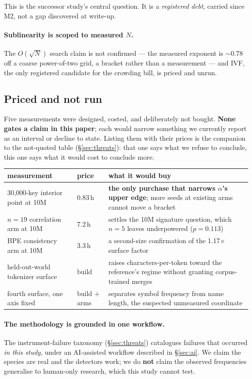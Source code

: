 \noindent This is the successor study's central question. It is a \emph{registered debt}, carried
since M2, not a gap discovered at write-up.

\paragraph{Sublinearity is scoped to measured $N$.} The $O(\sqrt{N})$ search claim is not confirmed
--- the measured exponent is ${\sim}0.78$ off a coarse power-of-two grid, a bracket rather than a
measurement --- and IVF, the only registered candidate for the crowding bill, is priced and unrun.

\subsection*{Priced and not run}

Five measurements were designed, costed, and deliberately not bought. \textbf{None gates a claim in
this paper}; each would narrow something we currently report as an interval or decline to state.
Listing them with their prices is the companion to the not-quoted table (\S\ref{sec:threats}): that
one says what we refuse to conclude, this one says what it would cost to conclude more.

\begin{center}\small
\begin{tabular}{@{}p{5.4cm}lp{5.6cm}@{}}
\toprule
measurement & price & what it would buy \\
\midrule
30{,}000-key interior point at 10M & 0.83\,h & \textbf{the only purchase that narrows $\alpha$'s
upper edge}; more seeds at existing arms cannot move a bracket \\
$n = 19$ correlation arm at 10M & 7.2\,h & settles the 10M signature question, which $n = 5$ leaves
underpowered ($p = 0.113$) \\
BPE consistency arm at 10M & 3.3\,h & a second-size confirmation of the 1.17$\times$ surface factor \\
held-out-world tokenizer surface & build & raises characters-per-token toward the reference's regime
without granting corpus-trained merges \\
fourth surface, one axis fixed & build $+$ arms & separates symbol frequency from name length, the
suspected unmeasured coordinate \\
\bottomrule
\end{tabular}
\end{center}

\paragraph{The methodology is grounded in one workflow.} The instrument-failure taxonomy
(\S\ref{sec:threats}) catalogues failures that occurred \emph{in this study}, under an AI-assisted
workflow described in \S\ref{sec:ai}. We claim the species are real and the detectors work; we do
\textbf{not} claim the observed frequencies generalise to human-only research, which this study
cannot test.
